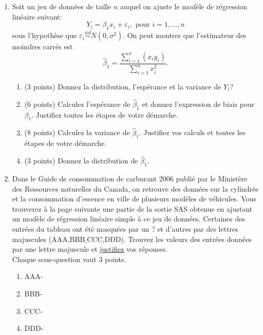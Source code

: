 \documentclass[a4paper, 11pt]{article}
\begin{document}
{\begin{enumerate}
\item 
Soit un jeu de données de taille $n$ auquel on ajuste le modèle de régression linéaire suivant:
\begin{equation*}
Y_i = \beta_1 x_i + \varepsilon_i, \mbox{ pour } i = 1,\ldots,n
\end{equation*}
sous l'hypothèse que $\varepsilon_i \overset{iid}{\sim}N(0, \sigma^2)$. On peut montrer que l'estimateur des moindres carrés est $$\widehat{\beta}_1 = \frac{\displaystyle \sum_{i=1}^n(x_iy_i)}{\displaystyle \sum_{i=1}^n x_i^2}.$$   
\begin{enumerate}
    \item (3 points) Donnez la distribution, l'espérance et la variance de $Y_i$? 
    \vspace{1.4 in }
    \item (6 points) Calculez l'espérance de $\widehat{\beta}_1$ et donnez l'expression de biais pour $\beta_1$. Justifiez toutes les étapes de votre démarche.
    \newpage
    \item (8 points) Calculez la variance de $\widehat{\beta}_1$. Justifiez vos calculs et toutes les étapes de votre démarche.
    \vspace{5 in }
    \item (3 points) Donnez la distribution de $\widehat{\beta}_1$.
\end{enumerate}

\newpage

\item 
Dans le Guide de consommation de carburant 2006 publié par le Ministère des Ressources
naturelles du Canada, on retrouve des données sur la cylindrée et la consommation d'essence
en ville de plusieurs modèles de véhicules. Vous trouverez à la page suivante une partie de la sortie SAS obtenue en ajustant un mod\`ele de r\'egression lin\'eaire simple \`a ce jeu de données. Certaines des entr\'ees du tableau ont \'et\'e masqu\'ees par un ? et d'autres par des lettres majuscules (AAA,BBB,CCC,DDD). Trouvez les valeurs des entrées données par une lettre majuscule et \underline{justifiez} vos r\'eponses. \\

Chaque sous-question vaut 3 points.\\

\vspace{0.1 in}

\begin{enumerate}
\item[]AAA-
\vspace{1 in}
\item[]BBB-
\vspace{1 in}
\item[]CCC-
\vspace{1 in}
\item[]DDD-
\end{enumerate}


\end{enumerate}}
\end{document}
